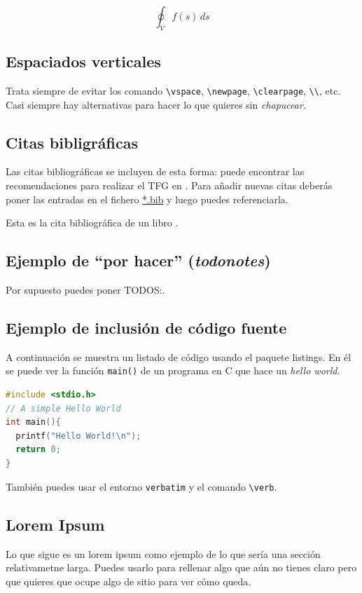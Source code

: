 \begin{displaymath}
  \oint_V f(s) \,ds
\end{displaymath}

\subsection{Espaciados verticales}

Trata siempre de evitar los comando \verb|\vspace|, \verb|\newpage|, \verb|\clearpage|, \verb|\\|, etc. Casi siempre hay alternativas para hacer lo que quieres sin \emph{chapucear}.

\subsection{Citas bibligráficas}

Las citas bibliográficas se incluyen de esta forma: puede encontrar
las recomendaciones para realizar el TFG en
\cite{recomendaciones}. Para añadir nuevas citas deberás poner las
entradas en el fichero \url{*.bib} y luego puedes referenciarla.

Esta es la cita bibliográfica de un libro \cite{ec}.

\subsection{Ejemplo de ``por hacer'' (\emph{todonotes})}

Por supuesto puedes poner TODOS:.


\subsection{Ejemplo de inclusión de código fuente}

A continuación se muestra un listado de código usando el paquete listings. En él se puede ver la función \lstinline{main()} de un programa en C que hace un \emph{hello world}.
\begin{lstlisting}[language=c]
#include <stdio.h>
// A simple Hello World
int main(){
  printf("Hello World!\n");
  return 0;
}
\end{lstlisting}

También puedes usar el entorno \texttt{verbatim} y el comando \verb|\verb|.

\subsection{Lorem Ipsum}
Lo que sigue es un lorem ipsum como ejemplo de lo que sería una
sección relativametne larga. Puedes usarlo para rellenar algo que aún
no tienes claro pero que quieres que ocupe algo de sitio para ver cómo
queda.

\lipsum
